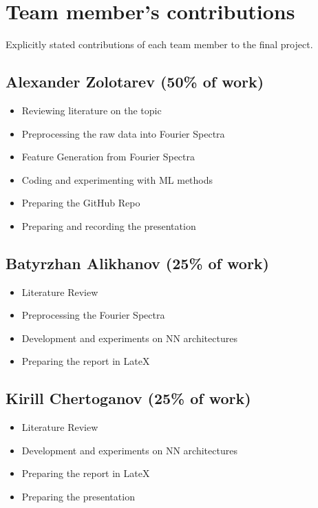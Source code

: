 \documentclass{article}
\begin{document}
\section{Team member's contributions}
\label{appendix-contrib}
Explicitly stated contributions of each team member to the final project.
\subsection*{Alexander Zolotarev (50\% of work)}
\begin{itemize}
    \item Reviewing literature on the topic
    \item Preprocessing the raw data into Fourier Spectra
    \item Feature Generation from Fourier Spectra
    \item Coding and experimenting with ML methods
    \item Preparing the GitHub Repo
    \item Preparing and recording the presentation
\end{itemize}

\subsection*{Batyrzhan Alikhanov (25\% of work)}
\begin{itemize}
    \item Literature Review
    \item Preprocessing the Fourier Spectra
    \item Development and experiments on NN architectures
    \item Preparing the report in LateX
\end{itemize}

\subsection*{Kirill Chertoganov (25\% of work)}
\begin{itemize}
    \item Literature Review
    \item Development and experiments on NN architectures
    \item Preparing the report in LateX 
    \item Preparing the presentation
\end{itemize}

\clearpage
\end{document}

